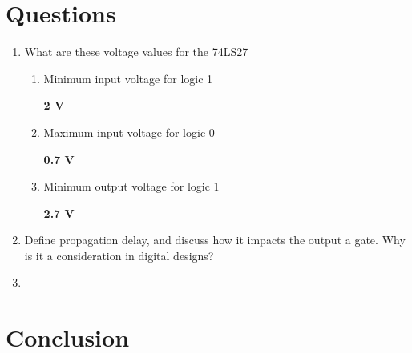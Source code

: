 \documentclass[CMPE]{KGCOEReport}
\begin{document}
\section*{Questions}

\begin{enumerate}
  \item What are these voltage values for the 74LS27
  \begin{enumerate}
  	\item Minimum input voltage for logic 1
  	
  	\textbf{2 V}
  	
  	\item Maximum input voltage for logic 0
  	
  	\textbf{0.7 V}
  	
  	\item Minimum output voltage for logic 1
  	
  	\textbf{2.7 V}
  \end{enumerate}
  
  \item Define propagation delay, and discuss how it impacts the output a gate. Why is it a consideration in digital designs?
  
  \item 
\end{enumerate}


\section*{Conclusion}
\end{document}
